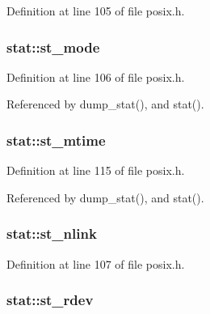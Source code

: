 Definition at line 105 of file posix.\+h.

\subsubsection[{\texorpdfstring{st\+\_\+mode}{st_mode}}]{ stat\+::st\+\_\+mode}\hypertarget{structstat_a5cbdd829011af82ba61e83773bbcbc7d}{}\label{structstat_a5cbdd829011af82ba61e83773bbcbc7d}


Definition at line 106 of file posix.\+h.



Referenced by dump\+\_\+stat(), and stat().

\subsubsection[{\texorpdfstring{st\+\_\+mtime}{st_mtime}}]{ stat\+::st\+\_\+mtime}\hypertarget{structstat_a77e235090f8cb6897f1c0ce65689006b}{}\label{structstat_a77e235090f8cb6897f1c0ce65689006b}


Definition at line 115 of file posix.\+h.



Referenced by dump\+\_\+stat(), and stat().

\subsubsection[{\texorpdfstring{st\+\_\+nlink}{st_nlink}}]{ stat\+::st\+\_\+nlink}\hypertarget{structstat_a0ed9092fa6c77a3251b9b9a4738ef84f}{}\label{structstat_a0ed9092fa6c77a3251b9b9a4738ef84f}


Definition at line 107 of file posix.\+h.

\subsubsection[{\texorpdfstring{st\+\_\+rdev}{st_rdev}}]{ stat\+::st\+\_\+rdev}\hypertarget{structstat_aa61e6c1a8a91c69f1d26f6700a0546cb}{}\label{structstat_aa61e6c1a8a91c69f1d26f6700a0546cb}


